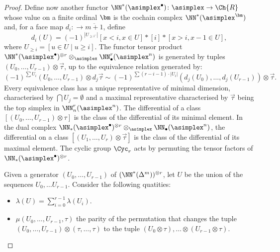 \begin{proof}
Define now another functor $\NN^*(\asimplex^\bullet)\colon \asimplex\to \Ch{R}$ whose value on a finite ordinal $\bm$ is the cochain complex $\NN^*(\asimplex^{\bm})$ and, for a face map $d_i\colon \bm\to \overline{m+1}$, define 
\[d_i(U) = (-1)^{|U_{\geq i ´}|}[x<i, x\in U]*[i]*[x>i, x-1 \in U],\]
where $U_{\geq i} = [u\in U\mid u\geq i]$. The functor tensor product $\NN^*(\asimplex^\bullet)^{\otimes r}\otimes_{\asimplex} \NN_\bullet^r(\asimplex^n)$ %
is generated by tuples $ (U_0,\ldots,U_{r-1})\otimes \vec{\tau}$, up to the equivalence relation generated by:
\begin{equation}\label{eq:59}(-1)^{\sum U_i}(U_0,\ldots,U_{r-1})\otimes d_j\vec{\tau}\sim (-1)^{\sum (r-i-1)\cdot |U_i|}(d_j(U_0),\ldots,d_j(U_{r-1}))\otimes \vec{\tau}.
\end{equation}
Every equivalence class has a unique representative of minimal dimension, characterised by $\bigcap U_j = \emptyset$ and a maximal representative characterised by $\vec{\tau}$ being the top simplex in $\NN_n^r(\asimplex^n)$. The differential of a class $[(U_0,\ldots,U_{r-1})\otimes \tau]$ is the class of the differential of its minimal element. In the dual complex $\NN_*(\asimplex^\bullet)^{\otimes r}\otimes_{\asimplex} \NN_\bullet(\asimplex^n)$, the differential on a class $[ (U_1,\ldots,U_r)\otimes \vec{\tau}]$ is the class of the differential of its maximal element. The cyclic group $\Cyc_r$ acts by permuting the tensor factors of $\NN_*(\asimplex^\bullet)^{\otimes r}$.
\begin{definition} Given a generator $(U_0,\ldots,U_{r-1})$ of $(\NN^*(\Delta^m))^{\otimes r}$, let $U$ be the union of the sequences $U_0,\ldots U_{r-1}$. Consider the following quatities:
\begin{itemize}
    \item $\lambda(U) = \sum_{i=0}^{r-1} \lambda(U_i)$.
    \item $\mu(U_0,\ldots,U_{r-1},\tau)$ the parity of the permutation that changes the tuple $(U_0,\ldots,U_{r-1})\otimes (\tau,\ldots,\tau)$ to the tuple $(U_0\otimes \tau), \ldots\otimes (U_{r-1}\otimes \tau)$.

\end{itemize}
\end{definition}
\end{proof}
